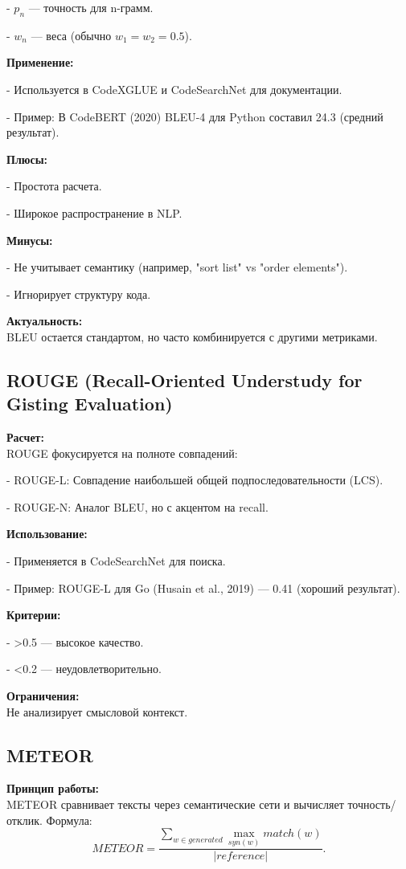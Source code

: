 \documentclass[14pt]{article}
\theoremstyle{definition}
\begin{document}
- $p_n$ — точность для n-грамм.
    
- $w_n$ — веса (обычно $w_1 = w_2 = 0.5$).


\textbf{Применение:}

    
- Используется в CodeXGLUE и CodeSearchNet для документации.
    
- Пример: В CodeBERT (2020) BLEU-4 для Python составил 24.3 (средний результат).


\textbf{Плюсы:}

    
- Простота расчета.
    
- Широкое распространение в NLP.


\textbf{Минусы:}

    
- Не учитывает семантику (например, "sort list" vs "order elements").
    
- Игнорирует структуру кода.


\textbf{Актуальность:} \\
BLEU остается стандартом, но часто комбинируется с другими метриками.

\subsection{ROUGE (Recall-Oriented Understudy for Gisting Evaluation)}

\textbf{Расчет:} \\
ROUGE фокусируется на полноте совпадений:

    
- ROUGE-L: Совпадение наибольшей общей подпоследовательности (LCS).
    
- ROUGE-N: Аналог BLEU, но с акцентом на recall.


\textbf{Использование:}

    
- Применяется в CodeSearchNet для поиска.
    
- Пример: ROUGE-L для Go (Husain et al., 2019) — 0.41 (хороший результат).


\textbf{Критерии:}

    
- >0.5 — высокое качество.
    
- <0.2 — неудовлетворительно.


\textbf{Ограничения:} \\
Не анализирует смысловой контекст.

\subsection{METEOR}

\textbf{Принцип работы:} \\
METEOR сравнивает тексты через семантические сети и вычисляет точность/отклик. Формула:
\[
METEOR = \frac{\sum_{w \in generated} \max_{syn(w)} match(w)}{|reference|}.
\]
\end{document}
